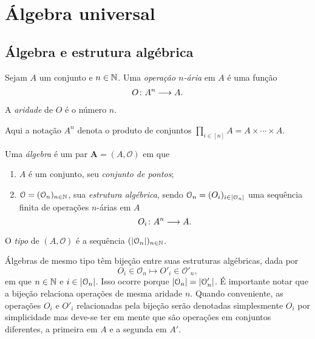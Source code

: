 \chapter{Álgebra universal}

\section{Álgebra e estrutura algébrica}

\begin{definition}
Sejam $A$ um conjunto e $n \in \mathbb{N}$. Uma \emph{operação $n$-ária} em $A$ é uma função
\begin{align*}
	{O}\colon {A^n} \longrightarrow {A}.
\end{align*}
A \emph{aridade} de $O$ é o número $n$.
\end{definition}

Aqui a notação $A^n$ denota o produto de conjuntos $\prod_{i \in [n]} A = A \times \cdots \times A$.

\begin{definition}
Uma \emph{álgebra} é um par $\bm A = (A,\mathcal O)$ em que
	\begin{enumerate}
		\item $A$ é um conjunto, seu \emph{conjunto de pontos};
		\item $\mathcal O = (\mathcal O_n)_{n \in \mathbb{N}}$, sua \emph{estrutura algébrica}, sendo $\mathcal O_n = (O_i)_{i \in \left\lvert{\mathcal O_n}\right\rvert}$ uma sequência finita de operações $n$-árias em $A$
			\begin{equation*}
				{O_i}\colon {A^n} \longrightarrow {A}.
			\end{equation*}
	\end{enumerate}
O \emph{tipo} de $(A,\mathcal O)$ é a sequência $(\left\lvert{\mathcal O_n}\right\rvert)_{n \in \mathbb{N}}$.

\end{definition}

Álgebras de mesmo tipo têm bijeção entre suas estruturas algébricas, dada por
	\begin{equation*}
		O_i \in \mathcal O_n \mapsto O'_i \in \mathcal O'_n,
	\end{equation*}
em que $n \in \mathbb{N}$ e $i \in \left\lvert{\mathcal O_n}\right\rvert$. Isso ocorre porque $\left\lvert{\mathcal O_n}\right\rvert = \left\lvert{\mathcal O'_n}\right\rvert$. É importante notar que a bijeção relaciona operações de mesma aridade $n$. Quando conveniente, as operações $O_i$ e $O'_i$ relacionadas pela bijeção serão denotadas simplesmente $O_i$ por simplicidade mas deve-se ter em mente que são operações em conjuntos diferentes, a primeira em $A$ e a segunda em $A'$.


